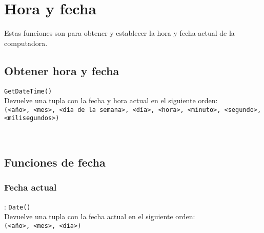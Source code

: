 
\titlespacing{\subsection}{0pt}{10pt}{0pt}

\chapter{Hora y fecha}
   Estas funciones son para obtener y establecer la hora y fecha actual de la computadora.
   
   \section{Obtener hora y fecha}
      \texttt{GetDateTime()}
      \\
      
      Devuelve una tupla con la fecha y hora actual en el siguiente orden:
      \\
      
      \texttt{(<año>, <mes>, <día de la semana>, <día>, <hora>, <minuto>, <segundo>, <milisegundos>)}
      \\
      
      \begin{fxcode}
         \\
      \end{fxcode}
   
   \section{Funciones de fecha}
      
      \subsection*{Fecha actual}: \texttt{Date()}\\
      Devuelve una tupla con la fecha actual en el siguiente  orden:
      \\
      
      \texttt{(<año>, <mes>, <dia>)}
      \\
      
      \begin{fxcode}
         \\
      \end{fxcode}
      
